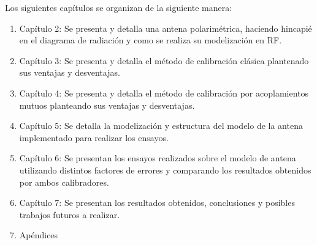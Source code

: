 Los siguientes capítulos se organizan de la siguiente manera:

\begin{enumerate}
	\item Capítulo 2: Se presenta y detalla una antena polarimétrica, haciendo hincapié en el diagrama de radiación y como
    se realiza su modelización en RF.
	\item Capítulo 3: Se presenta y detalla el método de calibración clásica plantenado sus ventajas y desventajas.
	\item Capítulo 4: Se presenta y detalla el método de calibración por acoplamientos mutuos planteando sus ventajas y
		desventajas.
	\item Capítulo 5: Se detalla la modelización y estructura del modelo de la antena implementado para realizar los ensayos.
	\item Capítulo 6: Se presentan los ensayos realizados sobre el modelo de antena utilizando distintos factores de errores y
		comparando los resultados obtenidos por ambos calibradores.
	\item Capítulo 7: Se presentan los resultados obtenidos, conclusiones y posibles trabajos futuros a realizar.
	\item Apéndices
\end{enumerate}

